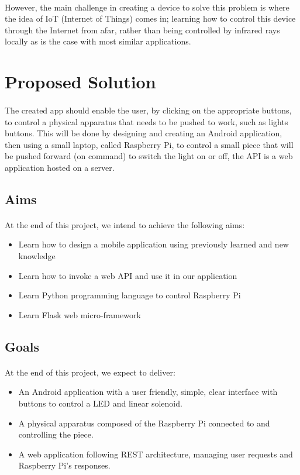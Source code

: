 \documentclass[12pt, oneside, a4paper]{book}
\begin{document}
		\paragraph{}However, the main challenge in creating a device to solve this problem is where the idea of IoT (Internet of Things) comes in; learning how to control this device through the Internet from afar, rather than being controlled by infrared rays locally as is the case with most similar applications. 
		\section{Proposed Solution}
		\paragraph{}The created app should enable the user, by clicking on the appropriate buttons, to control a physical apparatus that needs to be pushed to work, such as lights buttons. This will be done by designing and creating an Android application, then using a small laptop, called Raspberry Pi, to control a small piece that will be pushed forward (on command) to switch the light on or off, the API is a web application hosted on a server.
		
		\subsection{Aims}
			\paragraph{}At the end of this project, we intend to achieve the following aims:
			\begin{itemize}
	 			\item Learn how to design a mobile application using previously learned and new knowledge
				\item Learn how to invoke a web API and use it in our application
				\item Learn Python programming language to control Raspberry Pi
				\item Learn Flask web micro-framework
			\end{itemize}
		\subsection{Goals}
			\paragraph{} At the end of this project, we expect to deliver:
			\begin{itemize}
				\item An Android application with a user friendly, simple, clear interface with buttons to control a LED and linear solenoid.
				\item A physical apparatus composed of the Raspberry Pi connected to and controlling the piece.
				\item A web application following REST architecture, managing user  requests and Raspberry Pi's responses.
			\end{itemize}
\end{document}
